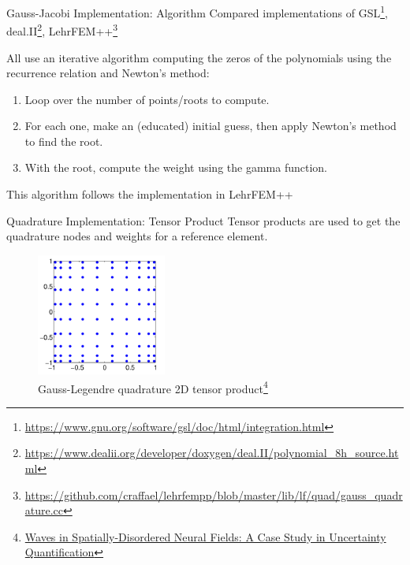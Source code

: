 \documentclass[xcolor=pdftex,table,10pt,yellow,mathserif]{beamer}
\begin{document}
\begin{frame}{Gauss-Jacobi Implementation: Algorithm}
    Compared implementations of GSL\footnote{\href{https://www.gnu.org/software/gsl/doc/html/integration.html\#c.gsl\_integration\_fixed\_alloc.gsl\_integration\_fixed\_type}{https://www.gnu.org/software/gsl/doc/html/integration.html}}, 
    deal.II\footnote{\href{https://www.dealii.org/developer/doxygen/deal.II/polynomial\_8h\_source.html\#l01039}{https://www.dealii.org/developer/doxygen/deal.II/polynomial\_8h\_source.html}}, 
    LehrFEM++\footnote{\href{https://github.com/craffael/lehrfempp/blob/master/lib/lf/quad/gauss\_quadrature.cc}{https://github.com/craffael/lehrfempp/blob/master/lib/lf/quad/gauss\_quadrature.cc}}
    \vspace*{0.5cm}
    \pause

    All use an iterative algorithm computing the zeros of the polynomials using the recurrence relation and Newton's method:
    \vspace*{0.25cm}
    \pause

    \begin{enumerate}
        \item Loop over the number of points/roots to compute.\pause
        \item For each one, make an (educated) initial guess, then apply Newton's method to find the root.\pause
        \item With the root, compute the weight using the gamma function.
    \end{enumerate}
    \vspace*{0.5cm}
    \pause

    This algorithm follows the implementation in LehrFEM++
\end{frame}

\begin{frame}{Quadrature Implementation: Tensor Product}
    Tensor products are used to get the quadrature nodes and weights for a reference element.

    \begin{figure}
        \includegraphics[height=4cm]{figures/gauss-legendre-tensor-product.png}
        \caption{Gauss-Legendre quadrature 2D tensor product\footnote{
            \href{https://www.researchgate.net/publication/284722736\_Waves\_in\_Spatially-Disordered\_Neural\_Fields\_A\_Case\_Study\_in\_Uncertainty\_Quantification}{Waves in Spatially-Disordered Neural Fields: A Case Study in Uncertainty Quantification}
        }}
    \end{figure}

\end{frame}
\end{document}
